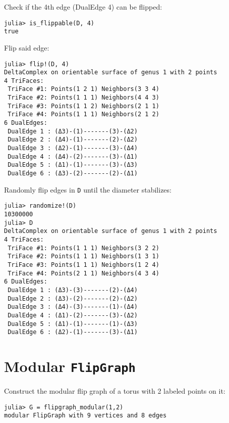 Check if the 4th edge (DualEdge 4) can be flipped:




\begin{verbatim}
julia> is_flippable(D, 4)
true
\end{verbatim}



Flip said edge:




\begin{verbatim}
julia> flip!(D, 4)
DeltaComplex on orientable surface of genus 1 with 2 points
4 TriFaces:
 TriFace #1: Points(1 2 1) Neighbors(3 3 4)
 TriFace #2: Points(1 1 1) Neighbors(4 4 3)
 TriFace #3: Points(1 1 2) Neighbors(2 1 1)
 TriFace #4: Points(1 1 1) Neighbors(2 1 2)
6 DualEdges:
 DualEdge 1 : (Δ3)-(1)-------(3)-(Δ2)
 DualEdge 2 : (Δ4)-(1)-------(2)-(Δ2)
 DualEdge 3 : (Δ2)-(1)-------(3)-(Δ4)
 DualEdge 4 : (Δ4)-(2)-------(3)-(Δ1)
 DualEdge 5 : (Δ1)-(1)-------(3)-(Δ3)
 DualEdge 6 : (Δ3)-(2)-------(2)-(Δ1)
\end{verbatim}



Randomly flip edges in \texttt{D} until the diameter stabilizes:




\begin{verbatim}
julia> randomize!(D)
10300000
julia> D
DeltaComplex on orientable surface of genus 1 with 2 points
4 TriFaces:
 TriFace #1: Points(1 1 1) Neighbors(3 2 2)
 TriFace #2: Points(1 1 1) Neighbors(1 3 1)
 TriFace #3: Points(1 1 1) Neighbors(1 2 4)
 TriFace #4: Points(2 1 1) Neighbors(4 3 4)
6 DualEdges:
 DualEdge 1 : (Δ3)-(3)-------(2)-(Δ4)
 DualEdge 2 : (Δ3)-(2)-------(2)-(Δ2)
 DualEdge 3 : (Δ4)-(3)-------(1)-(Δ4)
 DualEdge 4 : (Δ1)-(2)-------(3)-(Δ2)
 DualEdge 5 : (Δ1)-(1)-------(1)-(Δ3)
 DualEdge 6 : (Δ2)-(1)-------(3)-(Δ1)
\end{verbatim}



\section{Modular \texttt{FlipGraph}}



\label{8001572861945648375}{}


Construct the modular flip graph of a torus with 2 labeled points on it:




\begin{verbatim}
julia> G = flipgraph_modular(1,2)
modular FlipGraph with 9 vertices and 8 edges
\end{verbatim}



